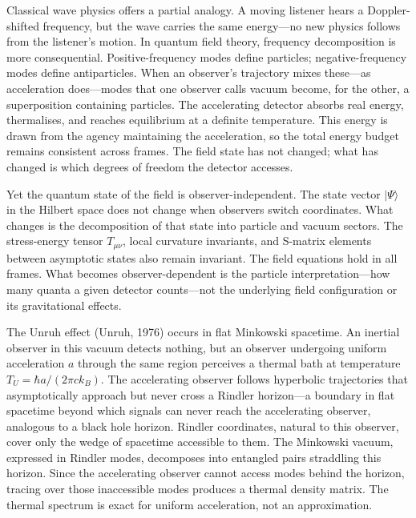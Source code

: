 Classical wave physics offers a partial analogy. A moving listener hears a Doppler-shifted frequency, but the wave carries the same energy—no new physics follows from the listener's motion. In quantum field theory, frequency decomposition is more consequential. Positive-frequency modes define particles; negative-frequency modes define antiparticles. When an observer's trajectory mixes these—as acceleration does—modes that one observer calls vacuum become, for the other, a superposition containing particles. The accelerating detector absorbs real energy, thermalises, and reaches equilibrium at a definite temperature. This energy is drawn from the agency maintaining the acceleration, so the total energy budget remains consistent across frames. The field state has not changed; what has changed is which degrees of freedom the detector accesses.

Yet the quantum state of the field is observer-independent. The state vector $|\Psi\rangle$ in the Hilbert space does not change when observers switch coordinates. What changes is the decomposition of that state into particle and vacuum sectors. The stress-energy tensor $T_{\mu\nu}$, local curvature invariants, and S-matrix elements between asymptotic states also remain invariant. The field equations hold in all frames. What becomes observer-dependent is the particle interpretation—how many quanta a given detector counts—not the underlying field configuration or its gravitational effects.

The Unruh effect (Unruh, 1976) occurs in flat Minkowski spacetime. An inertial observer in this vacuum detects nothing, but an observer undergoing uniform acceleration $a$ through the same region perceives a thermal bath at temperature $T_U = \hbar a/(2\pi c k_B)$. The accelerating observer follows hyperbolic trajectories that asymptotically approach but never cross a Rindler horizon—a boundary in flat spacetime beyond which signals can never reach the accelerating observer, analogous to a black hole horizon. Rindler coordinates, natural to this observer, cover only the wedge of spacetime accessible to them. The Minkowski vacuum, expressed in Rindler modes, decomposes into entangled pairs straddling this horizon. Since the accelerating observer cannot access modes behind the horizon, tracing over those inaccessible modes produces a thermal density matrix. The thermal spectrum is exact for uniform acceleration, not an approximation.

